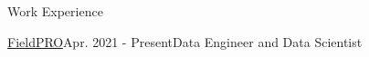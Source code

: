 \documentclass{resume} %
\begin{document}
\begin{rSection}{Work Experience}

\begin{rSubsection}{\href{https://fieldpro.com.br/}{FieldPRO}}{Apr. 2021 - Present}{Data Engineer and Data Scientist}{}




\end{rSubsection}
\end{rSection}
\end{document}
